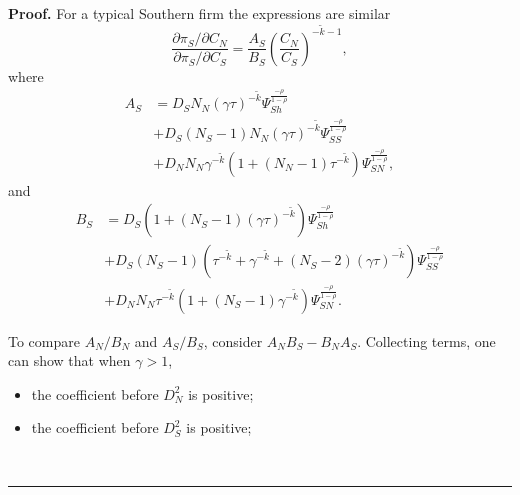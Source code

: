 \documentclass[notitlepage,11pt]{article}%
\newenvironment{proof}[1][Proof]{\noindent \textbf{#1.} }{\  \rule{0.5em}{0.5em}}
\begin{document}
\begin{proof}
For a typical Southern firm the expressions are similar%
\[
\frac{\partial\pi_{S}/\partial C_{N}}{\partial\pi_{S}/\partial C_{S}}%
=\frac{A_{S}}{B_{S}}\left(  \frac{C_{N}}{C_{S}}\right)  ^{-\tilde{k}-1},
\]
where%
\begin{align*}
A_{S}  &  =D_{S}N_{N}\left(  \gamma\tau\right)  ^{-\tilde{k}}\Psi_{Sh}%
^{\frac{-\rho}{1-\rho}}\\
&  +D_{S}\left(  N_{S}-1\right)  N_{N}\left(  \gamma\tau\right)  ^{-\tilde{k}%
}\Psi_{SS}^{\frac{-\rho}{1-\rho}}\\
&  +D_{N}N_{N}\gamma^{-\tilde{k}}\left(  1+\left(  N_{N}-1\right)
\tau^{-\tilde{k}}\right)  \Psi_{SN}^{\frac{-\rho}{1-\rho}},
\end{align*}
and%
\begin{align*}
B_{S}  &  =D_{S}\left(  1+\left(  N_{S}-1\right)  \left(  \gamma\tau\right)
^{-\tilde{k}}\right)  \Psi_{Sh}^{\frac{-\rho}{1-\rho}}\\
&  +D_{S}\left(  N_{S}-1\right)  \left(  \tau^{-\tilde{k}}+\gamma^{-\tilde{k}%
}+\left(  N_{S}-2\right)  \left(  \gamma\tau\right)  ^{-\tilde{k}}\right)
\Psi_{SS}^{\frac{-\rho}{1-\rho}}\\
&  +D_{N}N_{N}\tau^{-\tilde{k}}\left(  1+\left(  N_{S}-1\right)
\gamma^{-\tilde{k}}\right)  \Psi_{SN}^{\frac{-\rho}{1-\rho}}.
\end{align*}


To compare $A_{N}/B_{N}$ and $A_{S}/B_{S}$, consider $A_{N}B_{S}-B_{N}A_{S}$.
Collecting terms, one can show that when $\gamma>1$,

\begin{itemize}
\item the coefficient before $D_{N}^{2}$ is positive;

\item the coefficient before $D_{S}^{2}$ is positive;


\end{itemize}
\end{proof}
\end{document}
